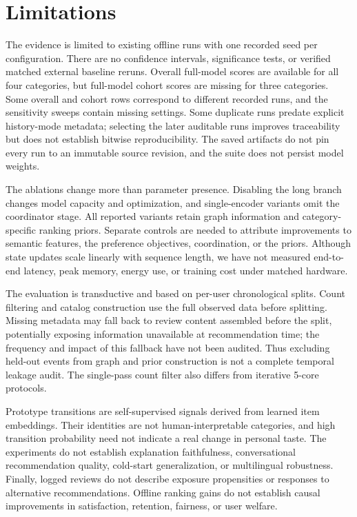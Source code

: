 \documentclass[11pt]{article}
\begin{document}
\section*{Limitations}
The evidence is limited to existing offline runs with one recorded seed per configuration. There are no confidence intervals, significance tests, or verified matched external baseline reruns. Overall full-model scores are available for all four categories, but full-model cohort scores are missing for three categories. Some overall and cohort rows correspond to different recorded runs, and the sensitivity sweeps contain missing settings. Some duplicate runs predate explicit history-mode metadata; selecting the later auditable runs improves traceability but does not establish bitwise reproducibility. The saved artifacts do not pin every run to an immutable source revision, and the suite does not persist model weights.

The ablations change more than parameter presence. Disabling the long branch changes model capacity and optimization, and single-encoder variants omit the coordinator stage. All reported variants retain graph information and category-specific ranking priors. Separate controls are needed to attribute improvements to semantic features, the preference objectives, coordination, or the priors. Although state updates scale linearly with sequence length, we have not measured end-to-end latency, peak memory, energy use, or training cost under matched hardware.

The evaluation is transductive and based on per-user chronological splits. Count filtering and catalog construction use the full observed data before splitting. Missing metadata may fall back to review content assembled before the split, potentially exposing information unavailable at recommendation time; the frequency and impact of this fallback have not been audited. Thus excluding held-out events from graph and prior construction is not a complete temporal leakage audit. The single-pass count filter also differs from iterative 5-core protocols.

Prototype transitions are self-supervised signals derived from learned item embeddings. Their identities are not human-interpretable categories, and high transition probability need not indicate a real change in personal taste. The experiments do not establish explanation faithfulness, conversational recommendation quality, cold-start generalization, or multilingual robustness. Finally, logged reviews do not describe exposure propensities or responses to alternative recommendations. Offline ranking gains do not establish causal improvements in satisfaction, retention, fairness, or user welfare.
\end{document}
